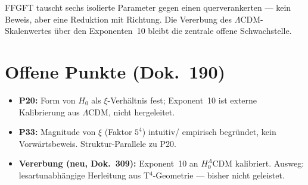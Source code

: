 \documentclass[11pt]{report}
\begin{document}
\medskip
FFGFT tauscht sechs isolierte Parameter gegen einen querverankerten —
kein Beweis, aber eine Reduktion mit Richtung. Die Vererbung des
$\Lambda$CDM-Skalenwertes über den Exponenten~10 bleibt die
zentrale offene Schwachstelle.

\chapter{Offene Punkte (Dok.~190)}

\begin{itemize}
  \item \textbf{P20:} Form von $H_0$ als $\xi$-Verhältnis fest;
        Exponent~10 ist externe Kalibrierung aus $\Lambda$CDM,
        nicht hergeleitet.
  \item \textbf{P33:} Magnitude von $\xi$ (Faktor $5^4$) intuitiv/
        empirisch begründet, kein Vorwärtsbeweis. Struktur-Parallele
        zu P20.
  \item \textbf{Vererbung (neu, Dok.~309):} Exponent~10 an
        $H_0^\Lambda$CDM kalibriert. Ausweg: lesartunabhängige
        Herleitung aus T$^4$-Geometrie — bisher nicht geleistet.
\end{itemize}
\end{document}
